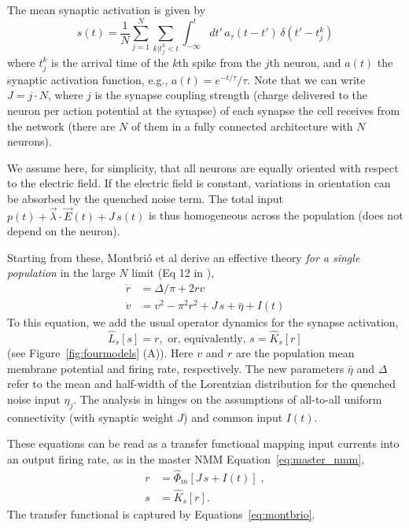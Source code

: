 \documentclass[12pt]{article}
\numberwithin{equation}{section}
\begin{document}
The mean synaptic activation is given by
\begin{equation}
    s(t) = \frac{1}{N}\sum_{j=1}^N \sum_{k | t^k_j < t} \int_{-\infty}^t dt' \, a_\tau(t-t') \, \delta(t'-t^k_j)
\end{equation}
where  $t^k_j$ is  the arrival time of the $k$th spike from the $j$th neuron, and  $a(t)$ the synaptic activation function, e.g., $a(t) = e^{-t/\tau}/\tau$.  Note that we can write $J=j\cdot N$, where $j$ is the synapse coupling strength (charge delivered to the neuron per action potential at the synapse) of each synapse the cell receives from the network (there are $N$ of them in a fully connected architecture with $N$ neurons). 

We assume here, for simplicity, that all neurons are equally oriented with respect to the electric field. If the electric field is constant, variations in orientation can be absorbed by the quenched noise term.
The total input $p(t) + \vec \lambda \cdot \vec E(t) + J \,s(t)$ is thus homogeneous across the population (does not depend on the neuron).  

Starting from these, Montbri\'o et al 
 derive an effective   theory \textit{for a single population} in the large $N$ limit (Eq 12 in \cite{Montbrio:2015aa}),
\begin{align} \label{eq:montbrio}
\dot r &=\Delta /\pi + 2r v \\
\dot v &=v^2  - \pi^2 r^2 +  J \, s +\bar \eta + I(t) 
\end{align}
To this equation, we add the usual operator dynamics for the synapse activation,
\begin{equation}
    \hat L_s[s] = r, \text{ or, equivalently,  } s= \hat K_s [r]
\end{equation}
(see Figure~\ref{fig:fourmodels} (A)). 
Here $v$ and $r$ are the population mean membrane potential and firing rate, respectively. The new parameters $\bar \eta$ and $\Delta$ refer to the mean and half-width of the Lorentzian distribution for the quenched noise input $\eta_j$. 
The analysis in \cite{Montbrio:2015aa} hinges on the assumptions of all-to-all uniform connectivity (with synaptic weight $J$) and common input $I(t)$. 

These equations can be read as a transfer functional mapping input currents into an output firing rate,  as in the master NMM Equation~\ref{eq:master_nmm},  
\begin{equation}\label{eq:master_nmm2}
\begin{aligned}
 r &=  \hat \Phi_m [J\, s +  I(t)] \;,\\
 s &= \hat K_s [r].
 \end{aligned}
\end{equation}
The transfer functional is captured by Equations~\ref{eq:montbrio}.
\end{document}
